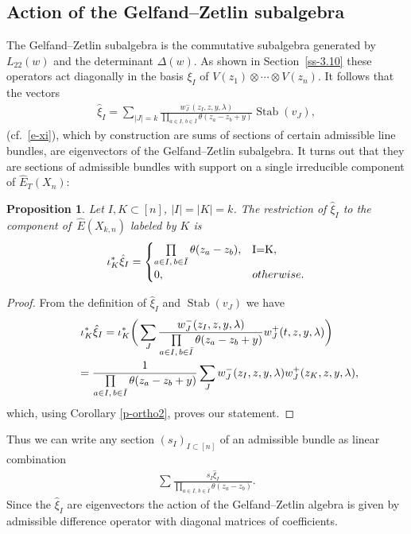 \documentclass[10pt,a4paper]{amsart}
\numberwithin{equation}{section}
\newtheorem{Proposition}[Theorem]{Proposition}
 { \theoremstyle{definition}
\newtheorem{Definition}[Theorem]{Definition}
\newtheorem{Example}[Theorem]{Example}
\newtheorem{Remark}[Theorem]{Remark} }
\begin{document}
\subsection{Action of the Gelfand--Zetlin subalgebra}\label{ss-6.1}
The Gelfand--Zetlin subalgebra is the commutative subalgebra generated by $L_{22}(w)$ and the determinant $\Delta(w)$. As shown in Section~\ref{ss-3.10} these operators act diagonally in the basis $\xi_I$ of $V(z_1)\otimes\cdots\otimes V(z_n)$. It follows that the vectors
\begin{gather*}
 \hat\xi_I=\sum_{|J|=k}\frac{w^-_J(z_I,z,y,\lambda)}{\prod\limits_{a\in I,\,b\in\bar I}\theta(z_a-z_b+y)} \operatorname{Stab}(v_J),
\end{gather*}
(cf.~\eqref{e-xi}), which by construction are sums of sections of certain admissible line bundles, are eigenvectors of the Gelfand--Zetlin subalgebra. It turns out that they are sections of admissible bundles with support on a single irreducible component of $\hat E_T(X_n)$:
\begin{Proposition} Let $I,K\subset [n]$, $|I|=|K|=k$. The restriction of $\hat\xi_I$ to the component of~$\hat E(X_{k,n})$ labeled by $K$ is
\begin{gather*}
\iota_K^*\hat\xi_I= \begin{cases} \prod\limits_{a\in I,\,b\in\bar I}\theta(z_a-z_b),& $I=K$,\\
0,& otherwise.
\end{cases}
\end{gather*}
\end{Proposition}
\begin{proof} From the definition of $\hat\xi_I$ and $\operatorname{Stab}(v_J)$ we have
\begin{gather*}
\iota_K^*\hat\xi_I =\iota_K^*\bigg(\sum_J \frac{ w_J^-(z_I,z,y,\lambda)}{\prod\limits_{a\in I, \,b\in \bar{I}} \theta(z_a-z_b+y)} w^+_J(t,z,y,\lambda) \bigg) \\
\hphantom{\iota_K^*\hat\xi_I}{} =\frac{1}{\prod\limits_{a\in I,\, b\in \bar{I}}\theta(z_a-z_b+y)} \sum_J w_J^-(z_I,z,y,\lambda) w^+_J(z_K,z,y,\lambda),
\end{gather*}
which, using Corollary \ref{p-ortho2}, proves our statement.
\end{proof}

Thus we can write any section $(s_I)_{I\subset[n]}$ of an admissible bundle as linear combination
\begin{gather*}
\sum \frac{s_I\hat\xi_I}{\prod\limits_{a\in I,\,b\in\bar I}\theta(z_a-z_b)}.\end{gather*}
Since the $\hat\xi_I$ are eigenvectors the action of the Gelfand--Zetlin algebra is given by admissible difference operator with diagonal matrices of coefficients.
\end{document}
